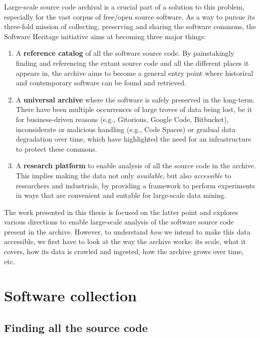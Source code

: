 Large-scale source code archival is a crucial part of a solution to this
problem, especially for the vast corpus of free/open source software.
As a way to pursue its three-fold mission of collecting, preserving and
sharing the software commons, the Software Heritage initiative aims at becoming
three major things:

\begin{enumerate}
    \item A \textbf{reference catalog} of all the software source code. By
        painstakingly finding and referencing the extant source code and
        all the different places it appears in, the archive aims to become a
        general entry point where historical and contemporary software can be
        found and retrieved.
    \item A \textbf{universal archive} where the software is safely preserved
        in the long-term. There have been multiple occurrences of large troves
        of data being lost, be it for business-driven reasons (e.g., Gitorious,
        Google Code, Bitbucket), inconsiderate or malicious handling (e.g.,
        Code Spaces) or gradual data degradation over time, which have
        highlighted the need for an infrastructure to protect these commons.
    \item A \textbf{research platform} to enable analysis of all the source
        code in the archive. This implies making the data not only
        \emph{available}, but also \emph{accessible} to researchers and
        industrials, by providing a framework to perform experiments in ways
        that are convenient and suitable for large-scale data mining.
\end{enumerate}

The work presented in this thesis is focused on the latter point and explores
various directions to enable large-scale analysis of the software source code
present in the archive. However, to understand \emph{how} we intend to make
this data accessible, we first have to look at the way the archive works: its
scale, what it covers, how its data is crawled and ingested, how the archive
grows over time, etc.

\section{Software collection}

\subsection{Finding all the source code}

